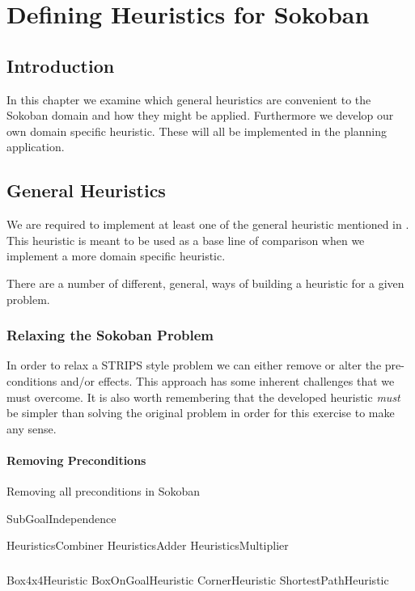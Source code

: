 \chapter{Defining Heuristics for Sokoban}
\label{cha:heuristics}

\section{Introduction}
In this chapter we examine which general heuristics are convenient to
the Sokoban domain and how they might be applied. Furthermore we
develop our own domain specific heuristic. These will all be
implemented in the planning application.

\section{General Heuristics}
We are required to implement at least one of the general heuristic
mentioned in \citet{Russell2003GeneralHeuristics}. This heuristic is
meant to be used as a base line of comparison when we implement a more
domain specific heuristic.

There are a number of different, general, ways of building a heuristic
for a given problem. 

\subsection{Relaxing the Sokoban Problem}
In order to relax a STRIPS style problem we can either remove or alter
the pre-conditions and/or effects. This approach has some inherent
challenges that we must overcome. It is also worth remembering that
the developed heuristic \emph{must} be simpler than solving the
original problem in order for this exercise to make any sense.

\subsubsection{Removing Preconditions}

Removing all preconditions in Sokoban 

SubGoalIndependence

HeuristicsCombiner
HeuristicsAdder
HeuristicsMultiplier


\subsection{}

Box4x4Heuristic
BoxOnGoalHeuristic
CornerHeuristic
ShortestPathHeuristic

